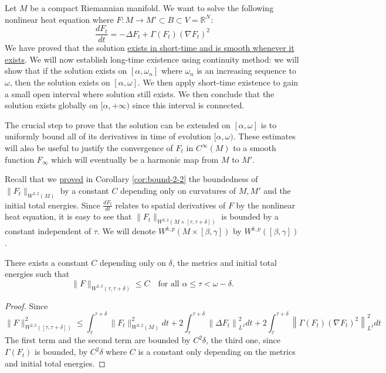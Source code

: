 \iffalse
\begin{info}
The PDF version of this page can be downloaded by replacing \texttt{html} in the its address by
\texttt{pdf}. 
For example \texttt{/html/sheaf-cohomology.html} should become \texttt{/pdf/sheaf-cohomology.pdf}.
\end{info}
\fi

Let \(M\) be a compact Riemannian manifold. We want to solve the following nonlinear
heat equation where \(F: M \longrightarrow M'\subset
B\subset V = \mathbb{R}^N\):
\[
 \frac{d F_t}{d t} = -\Delta F_t + \Gamma(F_t) (\nabla F_t)^2
\]
We have proved that the solution \href{polynomial-besov.org}{exists in short-time and is smooth whenever it exists}. We will now establish long-time existence using continuity
method: we will show that if the solution exists on \([\alpha,\omega_n]\) where
\(\omega_n\) is an increasing sequence to \(\omega\), then the solution exists on \([\alpha,\omega]\). We then apply short-time existence to gain a small open interval where
solution still exists. We then conclude that the solution exists globally on \([\alpha,+\infty)\) since this interval is connected.

The crucial step to prove that the solution can be extended on \([\alpha,\omega]\) is to
uniformly bound all of its derivatives in time of evolution \([\alpha,\omega)\). These
estimates will also be useful to justify the convergence of \(F_t\) in \(C^\infty(M)\) to a smooth function \(F_\infty\) which will eventually be a harmonic map
from \(M\) to \(M'\).

Recall that we \href{harmonic-maps.org}{proved} in Corollary \ref{cor:bound-2-2} the boundedness of \(\|F_t\|_{W^{2,2}(M)}\) by a constant \(C\) depending only on curvatures of \(M, M'\) and
the initial total energies. Since \(\frac{dF_t}{dt }\) relates to spatial derivatives of
\(F\) by the nonlinear heat equation, it is easy to see that \(\|F_t\|_{W^{2,2}(M\times[\tau,\tau +\delta])}\) is bounded by a constant independent of
\(\tau\). We will denote \(W^{k,p}(M\times [\beta,\gamma])\) by \(W^{k,p}([\beta,\gamma])\).

\begin{theorem}[\(W^{2,2}\)-boundedness]
\label{thm:bound-2-2}
There exists a constant \(C\) depending only on \(\delta\), the metrics and initial
total energies such that
\[
 \|F\|_{W^{2,2}(\tau,\tau+\delta)}\leq C\quad\text{for all } \alpha \leq \tau <\omega-\delta.
\]
\end{theorem}
\begin{proof}
Since 
\[ \|F\|^2_{W^{2,2}([\tau,\tau+\delta])} \leq \int_\tau^{\tau+\delta}
\|F_t\|^2_{W^{2,2}(M)} dt + 2\int_\tau^{\tau+\delta} \left\| \Delta F_t
\right\|^2_{L^2}dt + 2\int_\tau^{\tau+\delta} \left\| \Gamma(F_t)(\nabla F_t)^2
\right\|^2_{L^2}dt
\]
The first term and the second term are bounded by \(C^2\delta\), the third one, since \(\Gamma(F_t)\) is bounded, by \(C^2\delta\) where \(C\) is a constant only depending on
the metrics and initial total energies.
\end{proof}

